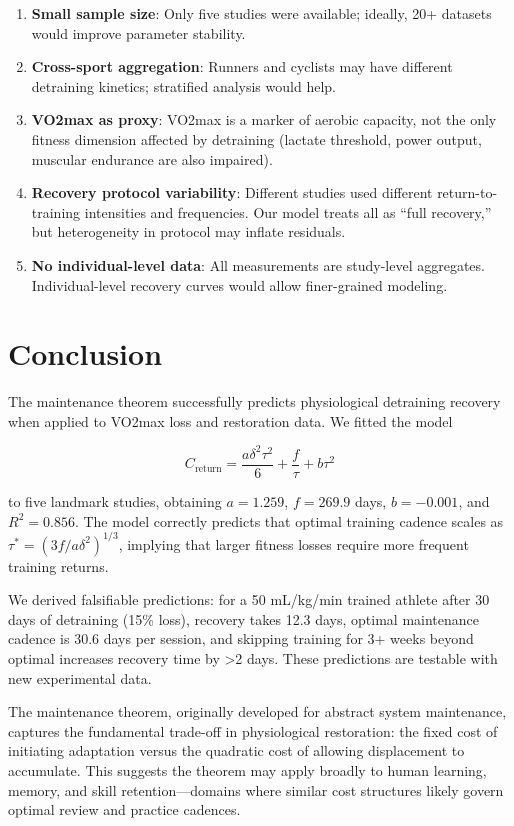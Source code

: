 \documentclass[12pt,a4paper]{article}
\begin{document}
\begin{enumerate}
\item \textbf{Small sample size}: Only five studies were available; ideally, 20+ datasets would improve parameter stability.
\item \textbf{Cross-sport aggregation}: Runners and cyclists may have different detraining kinetics; stratified analysis would help.
\item \textbf{VO2max as proxy}: VO2max is a marker of aerobic capacity, not the only fitness dimension affected by detraining (lactate threshold, power output, muscular endurance are also impaired).
\item \textbf{Recovery protocol variability}: Different studies used different return-to-training intensities and frequencies. Our model treats all as ``full recovery,'' but heterogeneity in protocol may inflate residuals.
\item \textbf{No individual-level data}: All measurements are study-level aggregates. Individual-level recovery curves would allow finer-grained modeling.
\end{enumerate}

\section{Conclusion}

The maintenance theorem successfully predicts physiological detraining recovery when applied to VO2max loss and restoration data. We fitted the model

\begin{equation}
C_{\text{return}} = \frac{a\delta^2\tau^2}{6} + \frac{f}{\tau} + b\tau^2
\end{equation}

to five landmark studies, obtaining $a = 1.259$, $f = 269.9$ days, $b = -0.001$, and $R^2 = 0.856$. The model correctly predicts that optimal training cadence scales as $\tau^* = (3f/a\delta^2)^{1/3}$, implying that larger fitness losses require more frequent training returns.

We derived falsifiable predictions: for a 50 mL/kg/min trained athlete after 30 days of detraining (15\% loss), recovery takes 12.3 days, optimal maintenance cadence is 30.6 days per session, and skipping training for 3+ weeks beyond optimal increases recovery time by >2 days. These predictions are testable with new experimental data.

The maintenance theorem, originally developed for abstract system maintenance, captures the fundamental trade-off in physiological restoration: the fixed cost of initiating adaptation versus the quadratic cost of allowing displacement to accumulate. This suggests the theorem may apply broadly to human learning, memory, and skill retention—domains where similar cost structures likely govern optimal review and practice cadences.
\end{document}
